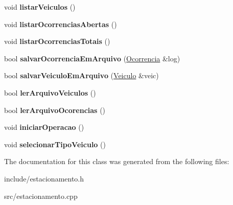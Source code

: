 \begin{DoxyCompactItemize}
void {\bfseries listar\+Veiculos} ()
\item 
\mbox{\label{classEstacionamento_afe3ed572fa1af5eea6c0b37709b51427}} 
void {\bfseries listar\+Ocorrencias\+Abertas} ()
\item 
\mbox{\label{classEstacionamento_a968f0a2e7cb15e6cd56e8993e8f545d1}} 
void {\bfseries listar\+Ocorrencias\+Totais} ()
\item 
\mbox{\label{classEstacionamento_af7ee5a954f739ddd645444bef3afccba}} 
bool {\bfseries salvar\+Ocorrencia\+Em\+Arquivo} (\hyperlink{classOcorrencia}{Ocorrencia} \&log)
\item 
\mbox{\label{classEstacionamento_a22f37266f480a52908e4f4b15a0bba08}} 
bool {\bfseries salvar\+Veiculo\+Em\+Arquivo} (\hyperlink{classVeiculo}{Veiculo} \&veic)
\item 
\mbox{\label{classEstacionamento_ababcab3f0c2ac1a530e554216524ade4}} 
bool {\bfseries ler\+Arquivo\+Veiculos} ()
\item 
\mbox{\label{classEstacionamento_a1cf2b3e312c02746102a2a06c4843b9c}} 
bool {\bfseries ler\+Arquivo\+Ocorencias} ()
\item 
\mbox{\label{classEstacionamento_aa95d8d36dc7c111e0b6d25a023711ef4}} 
void {\bfseries iniciar\+Operacao} ()
\item 
\mbox{\label{classEstacionamento_a38da97a6006b54e1185c9652a96d90e6}} 
void {\bfseries selecionar\+Tipo\+Veiculo} ()
\end{DoxyCompactItemize}


The documentation for this class was generated from the following files\+:\begin{DoxyCompactItemize}
\item 
include/estacionamento.\+h\item 
src/estacionamento.\+cpp\end{DoxyCompactItemize}
